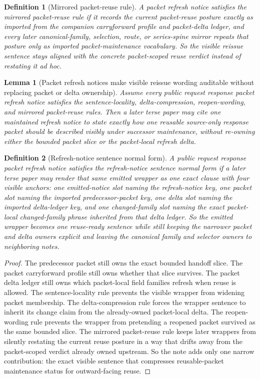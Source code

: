\documentclass[11pt]{article}
\newtheorem{definition}{Definition}
\newtheorem{lemma}{Lemma}
\begin{document}
\begin{definition}[Mirrored packet-reuse rule]
A packet refresh notice satisfies the \emph{mirrored packet-reuse rule} if it records the current packet-reuse posture exactly as imported from the companion carryforward profile and packet-delta ledger, and every later canonical-family, selection, route, or series-spine mirror repeats that posture only as imported packet-maintenance vocabulary.
So the visible reissue sentence stays aligned with the concrete packet-scoped reuse verdict instead of restating it ad hoc.
\end{definition}

\begin{lemma}[Packet refresh notices make visible reissue wording auditable without replacing packet or delta ownership]
Assume every public request response packet refresh notice satisfies the sentence-locality, delta-compression, reopen-wording, and mirrored packet-reuse rules.
Then a later terse paper may cite one maintained refresh notice to state exactly how one reusable source-only response packet should be described visibly under successor maintenance, without re-owning either the bounded packet slice or the packet-local refresh delta.
\end{lemma}

\begin{definition}[Refresh-notice sentence normal form]
A public request response packet refresh notice satisfies the \emph{refresh-notice sentence normal form} if a later terse paper may render that same emitted wrapper as one exact clause with four visible anchors: one emitted-notice slot naming the refresh-notice key, one packet slot naming the imported predecessor-packet key, one delta slot naming the imported delta-ledger key, and one changed-family slot naming the exact packet-local changed-family phrase inherited from that delta ledger.
So the emitted wrapper becomes one reuse-ready sentence while still keeping the narrower packet and delta owners explicit and leaving the canonical family and selector owners to neighboring notes.
\end{definition}

\begin{proof}
The predecessor packet still owns the exact bounded handoff slice.
The packet carryforward profile still owns whether that slice survives.
The packet delta ledger still owns which packet-local field families refresh when reuse is allowed.
The sentence-locality rule prevents the visible wrapper from widening packet membership.
The delta-compression rule forces the wrapper sentence to inherit its change claim from the already-owned packet-local delta.
The reopen-wording rule prevents the wrapper from pretending a reopened packet survived as the same bounded slice.
The mirrored packet-reuse rule keeps later wrappers from silently restating the current reuse posture in a way that drifts away from the packet-scoped verdict already owned upstream.
So the note adds only one narrow contribution: the exact visible sentence that compresses reusable-packet maintenance status for outward-facing reuse.\qedhere
\end{proof}
\end{document}
